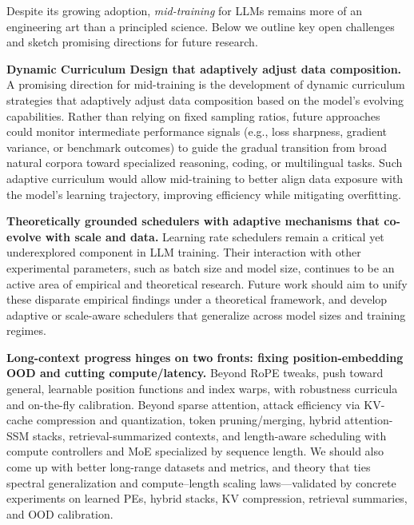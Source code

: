 \label{sec:future}
Despite its growing adoption, \emph{mid-training} for LLMs remains more of an engineering art than a principled science. Below we outline key open challenges and sketch promising directions for future research.


\textbf{Dynamic Curriculum Design that adaptively adjust data composition.} 
A promising direction for mid-training is the development of dynamic curriculum strategies that adaptively adjust data composition based on the model’s evolving capabilities. Rather than relying on fixed sampling ratios, future approaches could monitor intermediate performance signals (e.g., loss sharpness, gradient variance, or benchmark outcomes) to guide the gradual transition from broad natural corpora toward specialized reasoning, coding, or multilingual tasks. Such adaptive curriculum would allow mid-training to better align data exposure with the model’s learning trajectory, improving efficiency while mitigating overfitting.

{\textbf{Theoretically grounded schedulers with adaptive mechanisms that co-evolve with scale and data.}}
{Learning rate schedulers remain a critical yet underexplored component in LLM training. Their interaction with other experimental parameters, such as batch size and model size, continues to be an active area of empirical and theoretical research. Future work should aim to unify these disparate empirical findings under a theoretical framework, and develop adaptive or scale-aware schedulers that generalize across model sizes and training regimes.}

\textbf{Long-context progress hinges on two fronts: fixing position-embedding OOD and cutting compute/latency.} Beyond RoPE tweaks, push toward general, learnable position functions and index warps, with robustness curricula and on-the-fly calibration. Beyond sparse attention, attack efficiency via KV-cache compression and quantization, token pruning/merging, hybrid attention-SSM stacks, retrieval-summarized contexts, and length-aware scheduling with compute controllers and MoE specialized by sequence length. We should also come up with better long-range datasets and metrics, and theory that ties spectral generalization and compute–length scaling laws—validated by concrete experiments on learned PEs, hybrid stacks, KV compression, retrieval summaries, and OOD calibration.